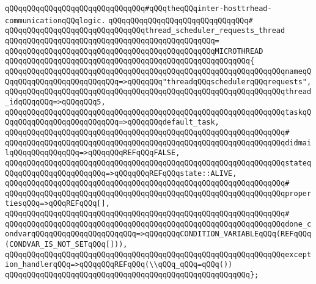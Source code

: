 \verb|qQQqqQQqqQQqqQQqqQQqqQQqqQQqqQQq#qQQqtheqQQqinter-hosttrhead-communicationqQQqlogic.|\newline
\verb|qQQqqQQqqQQqqQQqqQQqqQQqqQQqqQQq#|\newline
\verb|qQQqqQQqqQQqqQQqqQQqqQQqqQQqqQQqthread_scheduler_requests_thread|\newline
\verb|qQQqqQQqqQQqqQQqqQQqqQQqqQQqqQQqqQQqqQQqqQQqqQQq=|\newline
\verb|qQQqqQQqqQQqqQQqqQQqqQQqqQQqqQQqqQQqqQQqqQQqqQQqMICROTHREAD|\newline
\verb|qQQqqQQqqQQqqQQqqQQqqQQqqQQqqQQqqQQqqQQqqQQqqQQqqQQqqQQq{|\newline
\verb|qQQqqQQqqQQqqQQqqQQqqQQqqQQqqQQqqQQqqQQqqQQqqQQqqQQqqQQqqQQqqQQqnameqQQqqQQqqQQqqQQqqQQqqQQqqQQq=>qQQqqQQq"threadqQQqschedulerqQQqrequests",|\newline
\verb|qQQqqQQqqQQqqQQqqQQqqQQqqQQqqQQqqQQqqQQqqQQqqQQqqQQqqQQqqQQqqQQqthread_idqQQqqQQq=>qQQqqQQq5,|\newline
\verb|qQQqqQQqqQQqqQQqqQQqqQQqqQQqqQQqqQQqqQQqqQQqqQQqqQQqqQQqqQQqqQQqtaskqQQqqQQqqQQqqQQqqQQqqQQqqQQq=>qQQqqQQqdefault_task,|\newline
\verb|qQQqqQQqqQQqqQQqqQQqqQQqqQQqqQQqqQQqqQQqqQQqqQQqqQQqqQQqqQQqqQQq#|\newline
\verb|qQQqqQQqqQQqqQQqqQQqqQQqqQQqqQQqqQQqqQQqqQQqqQQqqQQqqQQqqQQqqQQqdidmailqQQqqQQqqQQqqQQq=>qQQqqQQqREFqQQqFALSE,|\newline
\verb|qQQqqQQqqQQqqQQqqQQqqQQqqQQqqQQqqQQqqQQqqQQqqQQqqQQqqQQqqQQqqQQqstateqQQqqQQqqQQqqQQqqQQqqQQq=>qQQqqQQqREFqQQqstate::ALIVE,|\newline
\verb|qQQqqQQqqQQqqQQqqQQqqQQqqQQqqQQqqQQqqQQqqQQqqQQqqQQqqQQqqQQqqQQq#|\newline
\verb|qQQqqQQqqQQqqQQqqQQqqQQqqQQqqQQqqQQqqQQqqQQqqQQqqQQqqQQqqQQqqQQqpropertiesqQQq=>qQQqREFqQQq[],|\newline
\verb|qQQqqQQqqQQqqQQqqQQqqQQqqQQqqQQqqQQqqQQqqQQqqQQqqQQqqQQqqQQqqQQq#|\newline
\verb|qQQqqQQqqQQqqQQqqQQqqQQqqQQqqQQqqQQqqQQqqQQqqQQqqQQqqQQqqQQqqQQqdone_condvarqQQqqQQqqQQqqQQqqQQqqQQq=>qQQqqQQqCONDITION_VARIABLEqQQq(REFqQQq(CONDVAR_IS_NOT_SETqQQq[])),|\newline
\verb|qQQqqQQqqQQqqQQqqQQqqQQqqQQqqQQqqQQqqQQqqQQqqQQqqQQqqQQqqQQqqQQqexception_handlerqQQq=>qQQqqQQqREFqQQq(\\qQQq_qQQq=qQQq())|\newline
\verb|qQQqqQQqqQQqqQQqqQQqqQQqqQQqqQQqqQQqqQQqqQQqqQQqqQQqqQQq};|\newline
